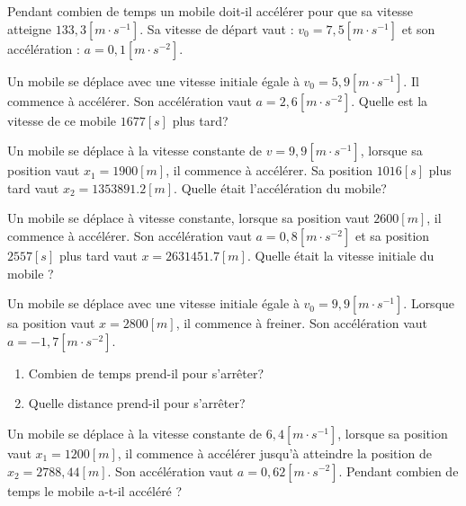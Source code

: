\begin{exercise}
  Pendant combien de temps un mobile doit-il accélérer pour que sa vitesse atteigne \(133,3\unit{[m \cdot s^{-1}]}\). Sa vitesse de départ vaut : \(v_0=7,5\unit{[m \cdot s^{-1}]}\) et son accélération : \(a=0,1\unit{[m \cdot s^{-2}]}\).
\end{exercise}


\begin{exercise}
  Un mobile se déplace avec une vitesse initiale égale à \(v_0=5,9\unit{[m \cdot s^{-1}]}\). Il commence à accélérer. Son accélération vaut \(a=2,6\unit{[m \cdot s^{-2}]}\).
  Quelle est la vitesse de ce mobile \(1677\unit{[s]}\) plus tard?
\end{exercise}

\begin{exercise}
  Un mobile se déplace à la vitesse constante de \(v=9,9\unit{[m \cdot s^{-1}]}\), lorsque sa position vaut \(x_1=1900[m]\), il commence à accélérer. Sa position \(1016\unit{[s]}\) plus tard vaut \(x_2=\num{1353891,2}[m]\).
  Quelle était l'accélération du mobile?
\end{exercise}

\begin{exercise}
  Un mobile se déplace à vitesse constante, lorsque sa position vaut \(2600[m]\), il commence à accélérer.
  Son accélération vaut \(a=0,8[m \cdot s^{-2}]\) et sa position \(2557\unit{[s]}\) plus tard vaut \(x=\num{2631451,7}[m]\).
  Quelle était la vitesse initiale du mobile ?
\end{exercise}

\begin{exercise}
  Un mobile se déplace avec une vitesse initiale égale à \(v_0=9,9[m \cdot s^{-1}]\). Lorsque sa position vaut \(x=2800[m]\), il commence à freiner. Son accélération vaut \(a=-1,7[m \cdot s^{-2}]\).
  \begin{enumerate}[label=\alph*)]
    \item Combien de temps prend-il pour s'arrêter?
    \item Quelle distance prend-il pour s'arrêter?
  \end{enumerate}
\end{exercise}

\begin{exercise}
  Un mobile se déplace à la vitesse constante de \(6,4[m \cdot s^{-1}]\), lorsque sa position vaut \(x_1=1200[m]\), il commence à accélérer jusqu'à atteindre la position de \(x_2=2788,44[m]\). Son accélération vaut \(a=0,62\unit{[m \cdot s^{-2}]}\).
  Pendant combien de temps le mobile a-t-il accéléré ?
\end{exercise}

